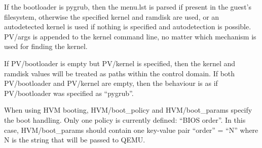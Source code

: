 If the bootloader is pygrub, then the menu.lst is parsed if present in the guest's filesystem, otherwise the specified kernel and ramdisk are used, or an autodetected kernel is used if nothing is specified and autodetection is possible.  PV/args is appended to the kernel command line, no matter which mechanism is used for finding the kernel.

If PV/bootloader is empty but PV/kernel is specified, then the kernel and ramdisk values will be treated as paths within the control domain.  If both PV/bootloader and PV/kernel are empty, then the behaviour is as if PV/bootloader was specified as ``pygrub''.

When using HVM booting, HVM/boot\_policy and HVM/boot\_params specify the boot handling.  Only one policy is currently defined: ``BIOS order''.  In this case, HVM/boot\_params should contain one key-value pair ``order'' = ``N'' where N is the string that will be passed to QEMU.